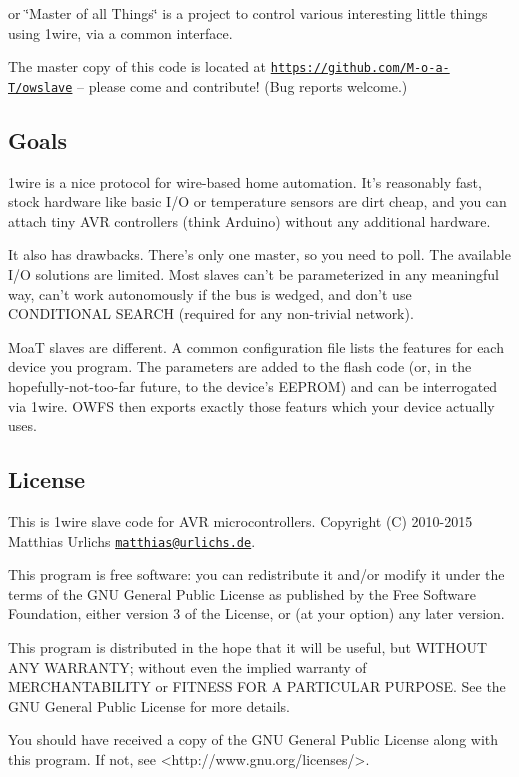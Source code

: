 or \char`\"{}\-Master of all Things\char`\"{} is a project to control various interesting little things using 1wire, via a common interface.

The master copy of this code is located at \href{https://github.com/M-o-a-T/owslave}{\tt https\-://github.\-com/\-M-\/o-\/a-\/\-T/owslave} -- please come and contribute! (Bug reports welcome.)

\subsection*{Goals}

1wire is a nice protocol for wire-\/based home automation. It's reasonably fast, stock hardware like basic I/\-O or temperature sensors are dirt cheap, and you can attach tiny A\-V\-R controllers (think Arduino) without any additional hardware.

It also has drawbacks. There's only one master, so you need to poll. The available I/\-O solutions are limited. Most slaves can't be parameterized in any meaningful way, can't work autonomously if the bus is wedged, and don't use C\-O\-N\-D\-I\-T\-I\-O\-N\-A\-L S\-E\-A\-R\-C\-H (required for any non-\/trivial network).

Moa\-T slaves are different. A common configuration file lists the features for each device you program. The parameters are added to the flash code (or, in the hopefully-\/not-\/too-\/far future, to the device's E\-E\-P\-R\-O\-M) and can be interrogated via 1wire. O\-W\-F\-S then exports exactly those featurs which your device actually uses.

\subsection*{License}

This is 1wire slave code for A\-V\-R microcontrollers. Copyright (C) 2010-\/2015 Matthias Urlichs \href{mailto:matthias@urlichs.de}{\tt matthias@urlichs.\-de}.

\begin{DoxyVerb}This program is free software: you can redistribute it and/or modify
it under the terms of the GNU General Public License as published by
the Free Software Foundation, either version 3 of the License, or
(at your option) any later version.

This program is distributed in the hope that it will be useful,
but WITHOUT ANY WARRANTY; without even the implied warranty of
MERCHANTABILITY or FITNESS FOR A PARTICULAR PURPOSE.  See the
GNU General Public License for more details.

You should have received a copy of the GNU General Public License
along with this program.  If not, see <http://www.gnu.org/licenses/>.
\end{DoxyVerb}


